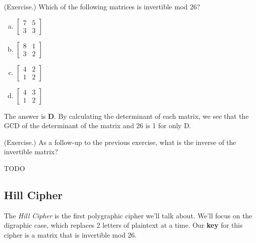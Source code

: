 \documentclass[letterpaper]{article}
\begin{document}
\begin{mdframed}
    (Exercise.) Which of the following matrices is invertible mod 26? 
    \begin{enumerate}[(a)]
        \item $\begin{bmatrix}
            7 & 5 \\ 3 & 3 
        \end{bmatrix}$
        \item $\begin{bmatrix}
            8 & 1 \\ 3 & 2 
        \end{bmatrix}$
        \item $\begin{bmatrix}
            4 & 2 \\ 1 & 2 
        \end{bmatrix}$
        \item $\begin{bmatrix}
            4 & 3 \\ 1 & 2
        \end{bmatrix}$
    \end{enumerate}

    \begin{mdframed}
        The answer is \textbf{D}. By calculating the determinant of each matrix, we see that the GCD of the determinant of the matrix and 26 is 1 for only D. 
    \end{mdframed}
\end{mdframed}

\begin{mdframed}
    (Exercise.) As a follow-up to the previous exercise, what is the inverse of the invertible matrix? 

    \begin{mdframed}
        TODO 
    \end{mdframed}
\end{mdframed}

\subsection{Hill Cipher}
The \emph{Hill Cipher} is the first polygraphic cipher we'll talk about. We'll focus on the digraphic case, which replaces 2 letters of plaintext at a time. Our \textbf{key} for this cipher is a matrix that is invertible mod 26. 
\end{document}
